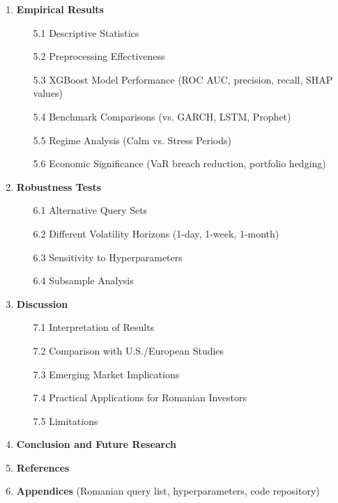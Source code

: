 \documentclass[12pt,a4paper]{article}
\begin{document}
\begin{enumerate}
    \item \textbf{Empirical Results}
    \begin{itemize}
        \item[5.1] Descriptive Statistics
        \item[5.2] Preprocessing Effectiveness
        \item[5.3] XGBoost Model Performance (ROC AUC, precision, recall, SHAP values)
        \item[5.4] Benchmark Comparisons (vs. GARCH, LSTM, Prophet)
        \item[5.5] Regime Analysis (Calm vs. Stress Periods)
        \item[5.6] Economic Significance (VaR breach reduction, portfolio hedging)
    \end{itemize}
    
    \item \textbf{Robustness Tests}
    \begin{itemize}
        \item[6.1] Alternative Query Sets
        \item[6.2] Different Volatility Horizons (1-day, 1-week, 1-month)
        \item[6.3] Sensitivity to Hyperparameters
        \item[6.4] Subsample Analysis
    \end{itemize}
    
    \item \textbf{Discussion}
    \begin{itemize}
        \item[7.1] Interpretation of Results
        \item[7.2] Comparison with U.S./European Studies
        \item[7.3] Emerging Market Implications
        \item[7.4] Practical Applications for Romanian Investors
        \item[7.5] Limitations
    \end{itemize}
    
    \item \textbf{Conclusion and Future Research}
    
    \item \textbf{References}
    
    \item \textbf{Appendices} (Romanian query list, hyperparameters, code repository)
\end{enumerate}
\end{document}

